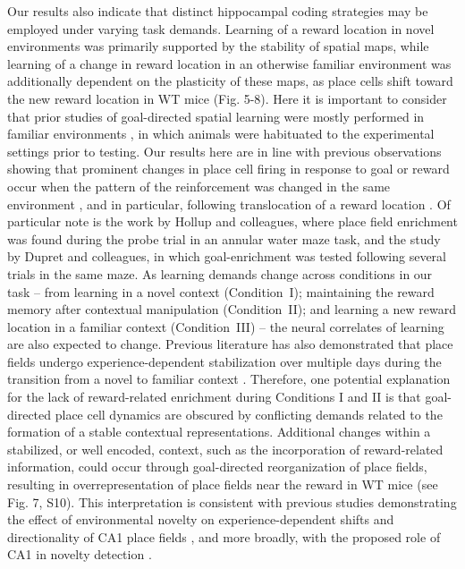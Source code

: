 Our results also indicate that distinct hippocampal coding strategies may be employed under varying task demands. Learning of a reward location in novel environments was primarily supported by the stability of spatial maps, while learning of a change in reward location in an otherwise familiar environment was additionally dependent on the plasticity of these maps, as place cells shift toward the new reward location in WT mice (Fig. 5-8). Here it is important to consider that prior studies of goal-directed spatial learning were mostly performed in familiar environments \citep{Breese1989, Dupret2010a, Fyhn2002, Hok2007, Hollup2001b, Kobayashi1997}, in which animals were habituated to the experimental settings prior to testing. Our results here are in line with previous observations showing that prominent changes in place cell firing in response to goal or reward occur when the pattern of the reinforcement was changed in the same environment \citep{Breese1989, Fyhn2002, Kobayashi1997, Markus1995}, and in particular, following translocation of a reward location \citep{Breese1989, Kobayashi1997}. Of particular note is the work by Hollup and colleagues, where place field enrichment was found during the probe trial in an annular water maze task, and the study by Dupret and colleagues, in which goal-enrichment was tested following several trials in the same maze. As learning demands change across conditions in our task -- from learning in a novel context (Condition~I); maintaining the reward memory after contextual manipulation (Condition~II); and learning a new reward location in a familiar context (Condition~III) -- the neural correlates of learning are also expected to change. Previous literature has also demonstrated that place fields undergo experience-dependent stabilization over multiple days during the transition from a novel to familiar context \citep{Cacucci2007, Frank2004, Hill1978, Karlsson2008, Leutgeb2004, Wilson1993}. Therefore, one potential explanation for the lack of reward-related enrichment during Conditions I and II is that goal-directed place cell dynamics are obscured by conflicting demands related to the formation of a stable contextual representations. Additional changes within a stabilized, or well encoded, context, such as the incorporation of reward-related information, could occur through goal-directed reorganization of place fields, resulting in overrepresentation of place fields near the reward in WT mice (see Fig. 7, S10). This interpretation is consistent with previous studies demonstrating the effect of environmental novelty on experience-dependent shifts and directionality of CA1 place fields \citep{Mehta1997, Navratilova2012, Roth2012, Lee2007}, and more broadly, with the proposed role of CA1 in novelty detection \citep{Duncan2012, Karlsson2008, Larkin2014, Nitz2004, Vinogradova2001, Lever2002a}.

